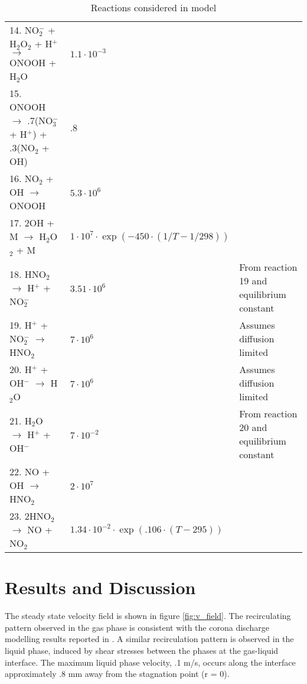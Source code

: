 \documentclass[12pt]{article}
\newcommand{\ONOOHlong}{14}
\newcommand{\OHfromONOOH}{15}
\newcommand{\ONOOHshort}{16}
\newcommand{\NitrousAcidAssociation}{19}
\newcommand{\WaterAssociation}{20}
\begin{document}
\begin{table}[htpb]
\begin{center}
\begin{tabular}{l |p{6cm} |p{3cm}}
            \ONOOHlong{}. NO$_2^-$ + H$_2$O$_2$ + H$^+$ $\rightarrow$ ONOOH + H$_2$O & $1.1\cdot10^{-3}$ & \cite{Lukes2014b}\\
            \OHfromONOOH{}. ONOOH $\rightarrow$ .7(NO$_3^-$ + H$^+$) + .3(NO$_2$ + OH) & .8 & \cite{coddington1999hydroxyl}\\
            \ONOOHshort{}. NO$_2$ + OH $\rightarrow$ ONOOH & $5.3\cdot10^{6}$ & \cite{Lukes2014b,goldstein2005chemistry}\\
            17. 2OH + M $\rightarrow$ H$_2$O$_2$ + M & $1\cdot10^{7}\cdot\exp(-450\cdot(1/T-1/298))$ & \cite{johnaelliot1990estimation}\\
            18. HNO$_2$ $\rightarrow$ H$^+$ + NO$_2^-$ & $3.51\cdot10^{6}$ & From reaction \NitrousAcidAssociation{} and equilibrium constant \\
            \NitrousAcidAssociation{}. H$^+$ + NO$_2^-$ $\rightarrow$ HNO$_2$ & $7\cdot10^{6}$ & Assumes diffusion limited\\
            \WaterAssociation{}. H$^+$ + OH$^-$ $\rightarrow$ H$_2$O & $7\cdot10^{6}$ & Assumes diffusion limited \\
            21. H$_2$O $\rightarrow$ H$^+$ + OH$^-$ & $7\cdot10^{-2}$ & From reaction \WaterAssociation{} and equilibrium constant\\
            22. NO + OH $\rightarrow$ HNO$_2$ & $2\cdot10^{7}$ & \cite{Tian2014}\\
			23. 2HNO$_2$ $\rightarrow$ NO + NO$_2$ & $1.34\cdot10^{-2}\cdot\exp(.106\cdot(T-295))$ & \cite{park1988solubility}
        \end{tabular}
    \end{center}
    \caption{Reactions considered in model}
    \label{tab:rxns}
\end{table}

\section{Results and Discussion}

The steady state velocity field is shown in figure \ref{fig:v_field}. The recirculating pattern observed in the gas phase is consistent with the corona discharge modelling results reported in \cite{Zhao2005a}. A similar recirculation pattern is observed in the liquid phase, induced by shear stresses between the phases at the gas-liquid interface. The maximum liquid phase velocity, .1 m/s, occurs along the interface approximately .8 mm away from the stagnation point (r = 0).   
\end{document}
